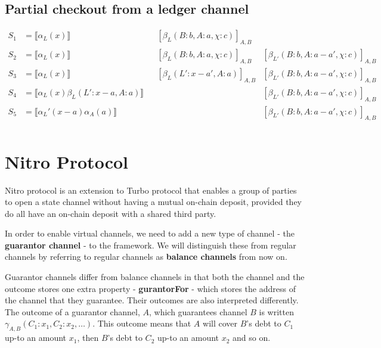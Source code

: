 \documentclass{article}
\theoremstyle{definition}
\newcommand{\adj}[1]{\llbracket #1 \rrbracket}
\newcommand{\enf}[1]{[#1]}
\begin{document}
\subsection{Partial checkout from a ledger channel}

\begin{align*}
S_1 &= \adj{\alpha_L(x)} &&\enf{\beta_L(B: b, A: a, \chi: c)}_{A, B} & \\
S_2 &= \adj{\alpha_L(x)} &&\enf{\beta_L(B: b, A: a, \chi: c)}_{A, B} & \enf{\beta_{L'}(B: b, A: a - a', \chi: c)}_{A, B}\\
S_3 &= \adj{\alpha_L(x)} &&\enf{\beta_L(L': x-a', A: a)}_{A, B} & \enf{\beta_{L'}(B: b, A: a - a', \chi: c)}_{A, B}\\
S_4 &= \adj{\alpha_L(x)\beta_L(L': x-a, A: a)} && & \enf{\beta_{L'}(B: b, A: a - a', \chi: c)}_{A, B}\\
S_5 &= \adj{\alpha_L'(x-a)\alpha_A(a)} && & \enf{\beta_{L'}(B: b, A: a - a', \chi: c)}_{A, B}\\
\end{align*}


\section{Nitro Protocol}

Nitro protocol is an extension to Turbo protocol that enables a group of parties to open a state channel without having a mutual on-chain deposit,
provided they do all have an on-chain deposit with a shared third party.

In order to enable virtual channels, we need to add a new type of channel - the \textbf{guarantor channel} - to the framework. We will distinguish these from regular channels by referring to regular channels as \textbf{balance channels} from now on.

Guarantor channels differ from balance channels in that both the channel and the outcome stores one extra property - \textbf{gurantorFor} - which stores the address of the channel that they guarantee. Their outcomes are also interpreted differently. The outcome of a guarantor channel, $A$, which guarantees channel $B$ is written $\gamma_{A, B}(C_1: x_1, C_2: x_2, \dots)$. This outcome means that $A$ will cover $B$'s debt to $C_1$ up-to an amount $x_1$, then $B$'s debt to $C_2$ up-to an amount $x_2$ and so on.
\end{document}

